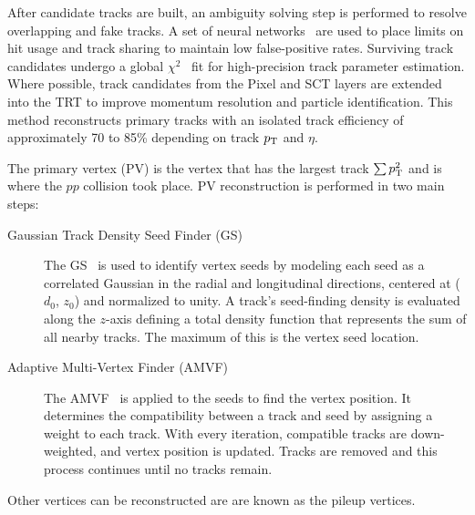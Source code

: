 After candidate tracks are built, an ambiguity solving step is performed to resolve overlapping and fake tracks. A set of neural networks~\cite{ATLAS:2024vdo} are used to place limits on hit usage and track sharing to maintain low false-positive rates. Surviving track candidates undergo a global $\chi^{2}$~\cite{Cornelissen:2008zza} fit for high-precision track parameter estimation. Where possible, track candidates from the Pixel and SCT layers are extended into the TRT to improve momentum resolution and particle identification. This method reconstructs primary tracks with an isolated track efficiency of approximately 70 to 85\% depending on track $p_{\mathrm{T}}$ and $\eta$. 

The primary vertex (PV) is the vertex that has the largest track $\sum p_{\mathrm{T}}^{2}$ and is where the $pp$ collision took place. PV reconstruction is performed in two main steps:
\begin{description}
  \item[Gaussian Track Density Seed Finder (GS)] The GS~\cite{ATLAS:2019jmx} is used to identify vertex seeds by modeling each seed as a correlated Gaussian in the radial and longitudinal directions, centered at ($d_{0}$, $z_{0}$) and normalized to unity. A track's seed-finding density is evaluated along the $z$-axis defining a total density function that represents the sum of all nearby tracks. The maximum of this is the vertex seed location.
  \item[Adaptive Multi-Vertex Finder (AMVF)] The AMVF~\cite{cms_AMVF} is applied to the seeds to find the vertex position. It determines the compatibility between a track and seed by assigning a weight to each track. With every iteration, compatible tracks are down-weighted, and vertex position is updated. Tracks are removed and this process continues until no tracks remain.
\end{description}
Other vertices can be reconstructed are are known as the pileup vertices.
